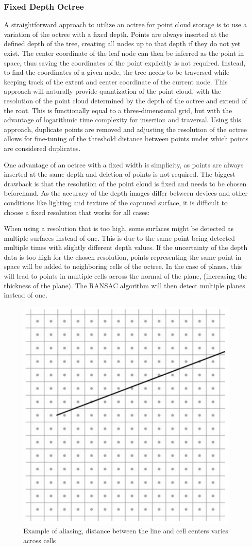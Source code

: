 \subsubsection{Fixed Depth Octree}
A straightforward approach to utilize an octree for point cloud storage is to use a variation of the octree with a fixed depth.
Points are always inserted at the defined depth of the tree, creating all nodes up to that depth if they do not yet exist.
The center coordinate of the leaf node can then be inferred as the point in space,
thus saving the coordinates of the point explicitly is not required.
Instead, to find the coordinates of a given node, the tree needs to be traversed while keeping track of
the extent and center coordinate of the current node.
This approach will naturally provide quantization of the point cloud, with the resolution of the point cloud
determined by the depth of the octree and extend of the root.
This is functionally equal to a three-dimensional grid,
but with the advantage of logarithmic time complexity for insertion and traversal.
Using this approach, duplicate points are removed and adjusting the resolution of the octree
allows for fine-tuning of the threshold distance between points under which points are considered duplicates.

One advantage of an octree with a fixed width is simplicity, as points are always inserted at the same depth and deletion of points is not required.
The biggest drawback is that the resolution of the point cloud is fixed and needs to be chosen beforehand.
As the accuracy of the depth images differ between devices and other conditions like lighting and texture of the captured surface,
it is difficult to choose a fixed resolution that works for all cases:

When using a resolution that is too high, some surfaces might be detected as multiple surfaces instead of one.
This is due to the same point being detected multiple times with slightly different depth values.
If the uncertainty of the depth data is too high for the chosen resolution,
points representing the same point in space will be added to neighboring cells of the octree.
In the case of planes, this will lead to points in multiple cells across the normal of the plane,
(increasing the thickness of the plane).
The RANSAC algorithm will then detect multiple planes instead of one.

\begin{figure}[h!]
    \centering
    \includegraphics[width=0.35\linewidth]{images/aliasing}
    \caption{Example of aliasing, distance between the line and cell centers varies across cells}
    \label{fig:aliasing}
\end{figure}

